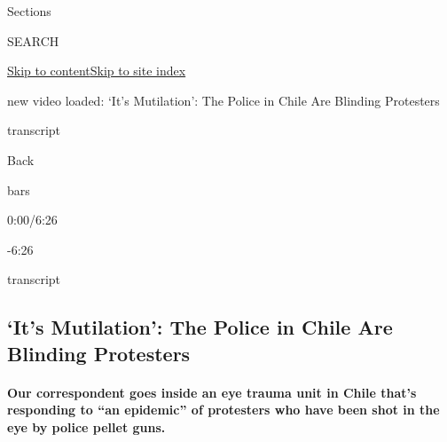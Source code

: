 Sections

SEARCH

\protect\hyperlink{site-content}{Skip to
content}\protect\hyperlink{site-index}{Skip to site index}

new video loaded: `It's Mutilation': The Police in Chile Are Blinding
Protesters

transcript

Back

bars

0:00/6:26

-6:26

transcript

\hypertarget{its-mutilation-the-police-in-chile-are-blinding-protesters}{%
\subsection{`It's Mutilation': The Police in Chile Are Blinding
Protesters}\label{its-mutilation-the-police-in-chile-are-blinding-protesters}}

\hypertarget{our-correspondent-goes-inside-an-eye-trauma-unit-in-chile-thats-responding-to-an-epidemic-of-protesters-who-have-been-shot-in-the-eye-by-police-pellet-guns}{%
\paragraph{Our correspondent goes inside an eye trauma unit in Chile
that's responding to ``an epidemic'' of protesters who have been shot in
the eye by police pellet
guns.}\label{our-correspondent-goes-inside-an-eye-trauma-unit-in-chile-thats-responding-to-an-epidemic-of-protesters-who-have-been-shot-in-the-eye-by-police-pellet-guns}}

